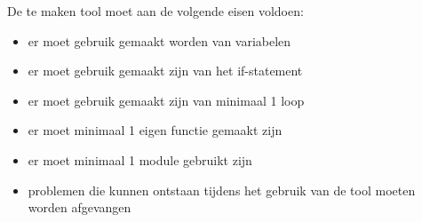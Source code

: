 De te maken tool moet aan de volgende eisen voldoen:
\begin{itemize}
\item er moet gebruik gemaakt worden van variabelen
\item er moet gebruik gemaakt zijn van het if-statement
\item er moet gebruik gemaakt zijn van minimaal 1 loop
\item er moet minimaal 1 eigen functie gemaakt zijn
\item er moet minimaal 1 module gebruikt zijn
\item problemen die kunnen ontstaan tijdens het gebruik van de tool moeten worden afgevangen
\end{itemize}

